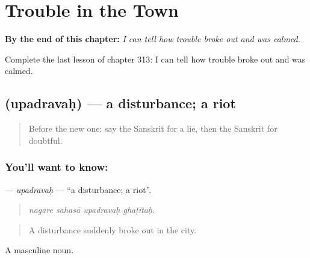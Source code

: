 
\chapter{Trouble in the Town}
\label{ch:sa-trouble-in-the-town}

\begin{chapteropening}
\textbf{By the end of this chapter:} \emph{I can tell how trouble broke out and was calmed.}

Complete the last lesson of chapter 313: I can tell how trouble broke out and was calmed.
\end{chapteropening}

\section[\texorpdfstring{\sk{उपद्रवः} (upadravaḥ)}{उपद्रवः (upadravaḥ)}]{ (upadravaḥ) — a disturbance; a riot}

\label{lesson:SA-C313-upadravah}



\begin{quote}
Before the new one: say the Sanskrit for a lie, then the Sanskrit for doubtful.
\end{quote}

\subsection*{You'll want to know: }
\textbf{} — \emph{upadravaḥ} — \textquotedblleft{}a disturbance; a riot\textquotedblright{}.

\begin{quote}
   
\end{quote}

\begin{quote}
\emph{nagare sahasā upadravaḥ ghaṭitaḥ.}
\end{quote}

\begin{quote}
A disturbance suddenly broke out in the city.
\end{quote}

A masculine noun.

